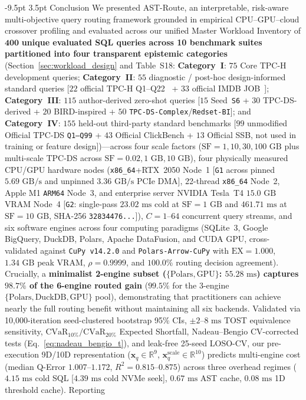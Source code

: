 \documentclass[10pt,a4paper]{article}
\makeatletter
\renewcommand\section{\@startsection{section}{1}{\z@}%
  {-9.5pt \@plus -2pt \@minus -1.5pt}%
  {3.5pt \@plus 1pt}%
  {\normalfont\large\bfseries}}
\makeatother
\begin{document}
\vspace{-6pt}
\section{Conclusion}
\enlargethispage{1.5\baselineskip}
\vspace{-3pt}
We presented AST-Route, an interpretable, risk-aware multi-objective query routing framework grounded in empirical CPU--GPU--cloud crossover profiling and evaluated across our unified Master Workload Inventory of $\mathbf{400}$ \textbf{unique evaluated SQL queries across 10 benchmark suites partitioned into four transparent epistemic categories} (Section~\ref{sec:workload_design} and Table~S18: \textbf{Category~I}: $75$ Core TPC-H development queries; \textbf{Category~II}: $55$ diagnostic / post-hoc design-informed standard queries [$22$ official TPC-H Q1--Q22~\cite{tpc2022tpch} + $33$ official IMDB JOB~\cite{leis2015job}]; \textbf{Category~III}: $115$ author-derived zero-shot queries [$15$ Seed~\texttt{S6} + $30$ TPC-DS-derived + $20$ BIRD-inspired + $50$ \texttt{TPC-DS-Complex}/\texttt{Redset-BI}]; and \textbf{Category~IV}: $155$ held-out third-party standard benchmarks [$99$ unmodified Official TPC-DS \texttt{Q1--Q99} + $43$ Official ClickBench + $13$ Official SSB, not used in training or feature design])---across four scale factors ($\text{SF}=1, 10, 30, 100\text{ GB}$ plus multi-scale TPC-DS across $\text{SF}=0.02, 1\text{ GB}, 10\text{ GB}$), four physically measured CPU/GPU hardware nodes (\texttt{x86\_64}+RTX~2050 Node~1 [\texttt{G1} across pinned $5.69\text{ GB/s}$ and unpinned $3.36\text{ GB/s}$ PCIe DMA], 22-thread \texttt{x86\_64} Node~2, Apple M1 \texttt{ARM64} Node~3, and enterprise server NVIDIA Tesla~T4 $15.0\text{ GB}$ VRAM Node~4 [\texttt{G2}: single-pass $23.02\text{ ms}$ cold at $\text{SF}=1\text{ GB}$ and $461.71\text{ ms}$ at $\text{SF}=10\text{ GB}$, SHA-256 \texttt{32834476...}]), $C=1\text{--}64$ concurrent query streams, and six software engines across four computing paradigms (SQLite~3, Google BigQuery, DuckDB, Polars, Apache DataFusion, and CUDA GPU, cross-validated against \texttt{CuPy v14.2.0} and \texttt{Polars-Arrow-CuPy} with $\text{EX}=1.000$, $1.34\text{ GB}$ peak VRAM, $\rho=0.9999$, and $100.0\%$ routing decision agreement). Crucially, a \textbf{minimalist 2-engine subset ($\{\text{Polars}, \text{GPU}\}$: $55.28\text{ ms}$) captures $98.7\%$ of the 6-engine routed gain} ($99.5\%$ for the 3-engine $\{\text{Polars}, \text{DuckDB}, \text{GPU}\}$ pool), demonstrating that practitioners can achieve nearly the full routing benefit without maintaining all six backends. Validated via 10,000-iteration seed-clustered bootstrap 95\% CIs, $\pm 2\text{--}8\text{ ms}$ TOST equivalence sensitivity, $\text{CVaR}_{10\%}/\text{CVaR}_{20\%}$ Expected Shortfall, Nadeau--Bengio CV-corrected tests (Eq.~\ref{eq:nadeau_bengio_t}), and leak-free 25-seed LOSO-CV, our pre-execution 9D/10D representation ($\mathbf{x}_q\in\mathbb{R}^9$, $\mathbf{x}_q^{\text{scale}}\in\mathbb{R}^{10}$) predicts multi-engine cost (median Q-Error $1.007\text{--}1.172$, $R^2=0.815\text{--}0.875$) across three overhead regimes ($4.15\text{ ms}$ cold SQL [$4.39\text{ ms}$ cold NVMe seek], $0.67\text{ ms}$ AST cache, $0.08\text{ ms}$ 1D threshold cache). Reporting 
\end{document}
